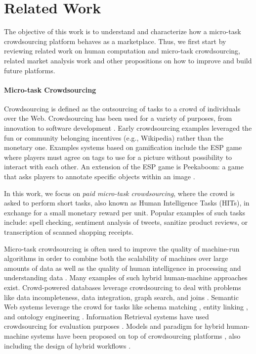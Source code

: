 \section{Related Work}\label{sec:relwork}

The objective of this work is to understand and characterize how a micro-task crowdsourcing platform behaves as a marketplace. Thus, we first start by reviewing related work on human computation and micro-task crowdsourcing, related market analysis work and other propositions on how to improve and build future platforms.

\paragraph{Micro-task Crowdsourcing}
Crowdsourcing is defined as the outsourcing of tasks to a crowd of individuals over the Web. Crowdsourcing has been used for a variety of purposes, from innovation to software development \cite{platforms}. 
% 
Early crowdsourcing examples leveraged the fun or community belonging incentives (e.g., Wikipedia) rather than the monetary one.
Examples systems based on gamification include the ESP game \cite{vonAhn:2008:DGP:1378704.1378719} where players must agree on tags to use for a picture without possibility to interact with each other. 
% 
An extension of the ESP game is Peekaboom: a game that asks players to annotate specific objects within an image \cite{vonAhn:2006:PGL:1124772.1124782}.

In this work, we focus on \emph{paid micro-task crowdsourcing}, where the crowd is asked to perform short tasks, also known as Human Intelligence Tasks (HITs), in exchange for a small monetary reward per unit. Popular examples of such tasks include: spell checking, sentiment analysis of tweets, sanitize product reviews, or transcription of scanned shopping receipts.

Micro-task crowdsourcing is often used to improve the quality of machine-run algorithms in order to combine both the scalability of machines over large amounts of data as well as the quality of human intelligence in processing and understanding data \cite{vonAhn:2008:DGP:1378704.1378719}. Many examples of such hybrid human-machine approaches exist.
% 
Crowd-powered databases \cite{crowddb} leverage crowdsourcing to deal with problems like  data incompleteness,  data integration, graph search, and joins \cite{crowder,graphsearch,crowdjoins}.
% 
Semantic Web systems leverage the crowd for tasks like schema matching \cite{crowdmap}, entity linking \cite{zencrowd}, and ontology engineering \cite{bioonto}.
% 
Information Retrieval systems have used crowdsourcing for evaluation purposes \cite{mizzaroalonso}.
% 
Models and paradigm for hybrid human-machine systems have been proposed on top of crowdsourcing platforms \cite{crowdcomputer}, also including the design of hybrid workflows \cite{workflows}.

